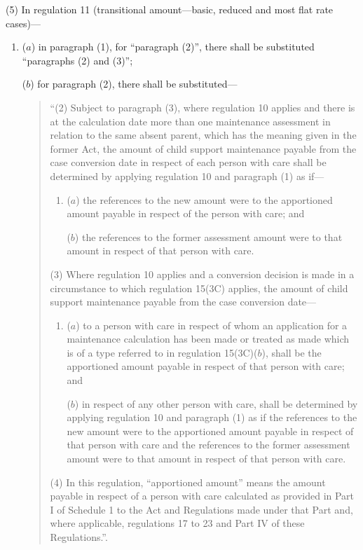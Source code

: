 \documentclass[12pt,a4paper]{article}
\begin{document}
(5) In regulation 11 (transitional amount—basic, reduced and most flat rate cases)—
\begin{enumerate}\item[]
($a$) in paragraph (1), for “paragraph (2)”, there shall be substituted “paragraphs (2) and (3)”;

($b$) for paragraph (2), there shall be substituted—
\begin{quotation}
“(2) Subject to paragraph (3), where regulation 10 applies and there is at the calculation date more than one maintenance assessment in relation to the same absent parent, which has the meaning given in the former Act, the amount of child support maintenance payable from the case conversion date in respect of each person with care shall be determined by applying regulation 10 and paragraph (1) as if—
\begin{enumerate}\item[]
($a$) the references to the new amount were to the apportioned amount payable in respect of the person with care; and

($b$) the references to the former assessment amount were to that amount in respect of that person with care.
\end{enumerate}

(3) Where regulation 10 applies and a conversion decision is made in a circumstance to which regulation 15(3C) applies, the amount of child support maintenance payable from the case conversion date—
\begin{enumerate}\item[]
($a$) to a person with care in respect of whom an application for a maintenance calculation has been made or treated as made which is of a type referred to in regulation 15(3C)($b$), shall be the apportioned amount payable in respect of that person with care; and

($b$) in respect of any other person with care, shall be determined by applying regulation 10 and paragraph (1) as if the references to the new amount were to the apportioned amount payable in respect of that person with care and the references to the former assessment amount were to that amount in respect of that person with care.
\end{enumerate}

(4) In this regulation, “apportioned amount” means the amount payable in respect of a person with care calculated as provided in Part I of Schedule 1 to the Act and Regulations made under that Part and, where applicable, regulations 17 to 23 and Part IV of these Regulations.”.
\end{quotation}
\end{enumerate}
\end{document}
